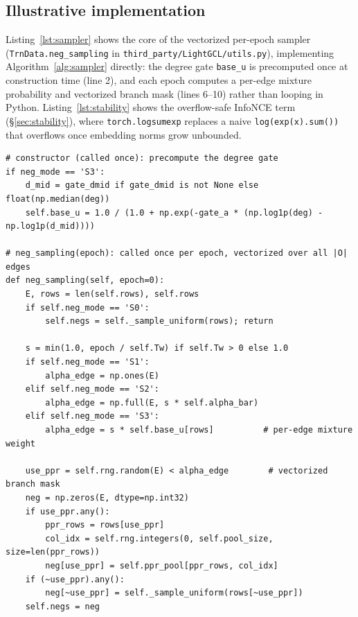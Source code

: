 \documentclass{article}
\begin{document}
\subsection{Illustrative implementation}
\label{sec:code-snippets}
Listing~\ref{lst:sampler} shows the core of the vectorized per-epoch sampler
(\texttt{TrnData.neg\_sampling} in \texttt{third\_party/LightGCL/utils.py}),
implementing Algorithm~\ref{alg:sampler} directly: the degree gate \texttt{base\_u}
is precomputed once at construction time (line 2), and each epoch computes a
per-edge mixture probability and vectorized branch mask (lines 6--10) rather than
looping in Python. Listing~\ref{lst:stability} shows the overflow-safe InfoNCE
term (\S\ref{sec:stability}), where \texttt{torch.logsumexp} replaces a naive
\texttt{log(exp(x).sum())} that overflows once embedding norms grow unbounded.

\begin{lstlisting}[style=py,float=t,caption={Degree-gated curriculum sampler: gate precompute (constructor) and per-epoch vectorized sampling.},label={lst:sampler}]
# constructor (called once): precompute the degree gate
if neg_mode == 'S3':
    d_mid = gate_dmid if gate_dmid is not None else float(np.median(deg))
    self.base_u = 1.0 / (1.0 + np.exp(-gate_a * (np.log1p(deg) - np.log1p(d_mid))))

# neg_sampling(epoch): called once per epoch, vectorized over all |O| edges
def neg_sampling(self, epoch=0):
    E, rows = len(self.rows), self.rows
    if self.neg_mode == 'S0':
        self.negs = self._sample_uniform(rows); return

    s = min(1.0, epoch / self.Tw) if self.Tw > 0 else 1.0
    if self.neg_mode == 'S1':
        alpha_edge = np.ones(E)
    elif self.neg_mode == 'S2':
        alpha_edge = np.full(E, s * self.alpha_bar)
    elif self.neg_mode == 'S3':
        alpha_edge = s * self.base_u[rows]          # per-edge mixture weight

    use_ppr = self.rng.random(E) < alpha_edge        # vectorized branch mask
    neg = np.zeros(E, dtype=np.int32)
    if use_ppr.any():
        ppr_rows = rows[use_ppr]
        col_idx = self.rng.integers(0, self.pool_size, size=len(ppr_rows))
        neg[use_ppr] = self.ppr_pool[ppr_rows, col_idx]
    if (~use_ppr).any():
        neg[~use_ppr] = self._sample_uniform(rows[~use_ppr])
    self.negs = neg
\end{lstlisting}
\end{document}
